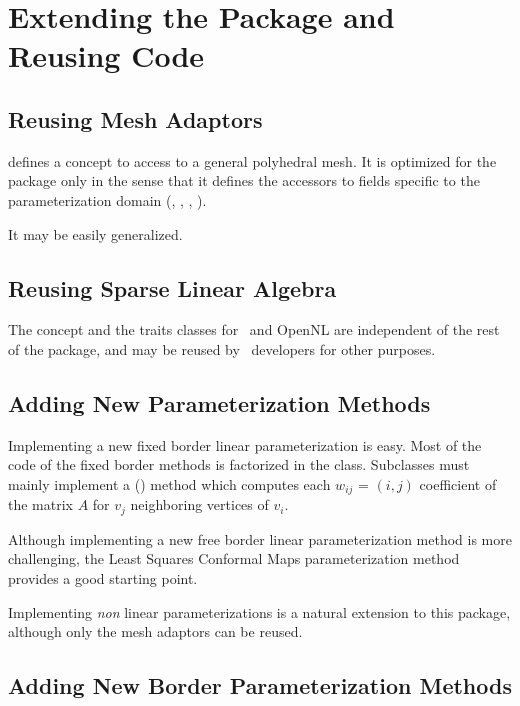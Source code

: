 \section{Extending the Package and Reusing Code}

\subsection{Reusing Mesh Adaptors}

 defines a concept to access to a
general polyhedral mesh.
It is optimized for the  package
only in the sense that it
defines the accessors to fields specific to the parameterization domain
(, , , ).

It may be easily generalized.


\subsection{Reusing Sparse Linear Algebra}

The  concept and the traits classes
for \eigen\ and OpenNL  are independent of the rest of the
 package, and may be reused by
\cgal\ developers for other purposes.


\subsection{Adding New Parameterization Methods}

Implementing a new fixed border linear parameterization is easy.  Most
of the code of the fixed border methods is factorized in the
class.  Subclasses must mainly
implement a () method which computes each
$w_{ij}$ = $(i, j)$ coefficient of the matrix $A$ for $v_j$ neighboring
vertices of $v_i$.

Although implementing a new free border linear parameterization
method is more challenging, the Least Squares Conformal Maps
parameterization method provides a good starting point.

Implementing \emph{non} linear parameterizations is a natural extension
to this package, although only the mesh adaptors can be reused.


\subsection{Adding New Border Parameterization Methods}

